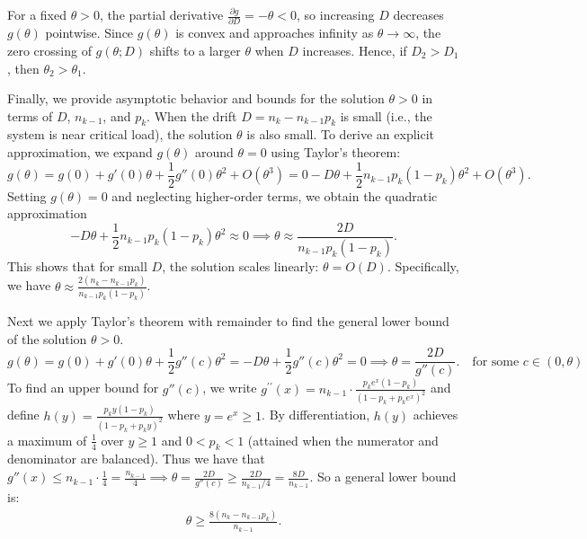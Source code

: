 For a fixed \(\theta > 0\), the partial derivative \(\frac{\partial g}{\partial D} = -\theta < 0\), so increasing \(D\) decreases \(g(\theta)\) pointwise. Since \(g(\theta)\) is convex and approaches infinity as \(\theta \to \infty\), the zero crossing of \(g(\theta; D)\) shifts to a larger \(\theta\) when \(D\) increases. Hence, if \(D_2 > D_1\), then \(\theta_2 > \theta_1\).

Finally, we provide asymptotic behavior and bounds for the solution \(\theta>0\) in terms of \(D\), \(n_{k-1}\), and \(p_k\). When the drift \(D = n_k - n_{k-1} p_k\) is small (i.e., the system is near critical load), the solution \(\theta\) is also small. To derive an explicit approximation, we expand \(g(\theta)\) around \(\theta = 0\) using Taylor's theorem:
$$g(\theta) = g(0) + g'(0) \theta + \frac{1}{2} g''(0) \theta^2 + O(\theta^3) = 0 - D \theta + \frac{1}{2} n_{k-1} p_k (1 - p_k) \theta^2 + O(\theta^3).$$
Setting \(g(\theta) = 0\) and neglecting higher-order terms, we obtain the quadratic approximation
$$-D \theta + \frac{1}{2} n_{k-1} p_k (1 - p_k) \theta^2 \approx 0 \implies \theta \approx \frac{2D}{n_{k-1} p_k (1 - p_k)}.$$
This shows that for small \(D\), the solution scales linearly: \(\theta = O(D)\). Specifically, we have $\theta \approx \frac{2 (n_k - n_{k-1} p_k)}{n_{k-1} p_k (1 - p_k)}$.

Next we apply Taylor's theorem with remainder to find the general lower bound of the solution $\theta>0$.
$$g(\theta) = g(0) + g'(0) \theta + \frac{1}{2} g''(c) \theta^2 = -D \theta + \frac{1}{2} g''(c) \theta^2 = 0\implies \theta = \frac{2D}{g''(c)}. \quad \text{for some } c \in (0, \theta)$$
To find an upper bound for \(g''(c)\), we write $g^{\prime \prime}(x) = n_{k-1} \cdot \frac{p_k e^{x} (1 - p_k)}{(1 - p_k + p_k e^{x})^2}$ and define \(h(y) = \frac{p_k y (1 - p_k)}{(1 - p_k + p_k y)^2}\) where \(y = e^{x} \geq 1\). By differentiation, \(h(y)\) achieves a maximum of \(\frac{1}{4}\) over $y\geq 1$ and $0<p_k<1$ (attained when the numerator and denominator are balanced). Thus we have that $
g''(x) \leq n_{k-1} \cdot \frac{1}{4} = \frac{n_{k-1}}{4} \implies \theta = \frac{2D}{g''(c)} \geq \frac{2D}{n_{k-1}/4} = \frac{8D}{n_{k-1}}$. So a general lower bound is:
\begin{align}
    \theta \geq \frac{8 (n_k - n_{k-1} p_k)}{n_{k-1}}.\label{eq::theta lower bound}
\end{align}